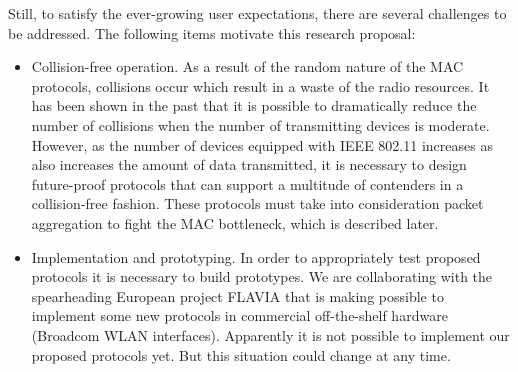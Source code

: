 \documentclass[a4paper,twocolumns]{article}%
\begin{document}
Still, to satisfy the ever-growing user expectations, there are several challenges to be addressed.
The following items motivate this research proposal:
\begin{itemize}
\item Collision-free operation.
As a result of the random nature of the MAC protocols, collisions occur which result in a waste of the radio resources.
It has been shown in the past that it is possible to dramatically reduce the number of collisions when the number of transmitting devices is moderate.
However, as the number of devices equipped with IEEE 802.11 increases as also increases the amount of data transmitted, it is necessary to design future-proof protocols that can support a multitude of contenders in a collision-free fashion.
These protocols must take into consideration packet aggregation to fight the MAC bottleneck, which is described later.
\item Implementation and prototyping.
In order to appropriately test proposed protocols it is necessary to build prototypes.
We are collaborating with the spearheading European project FLAVIA that is making possible to implement some new protocols in commercial off-the-shelf hardware (Broadcom WLAN interfaces).
Apparently it is not possible to implement our proposed protocols yet.
But this situation could change at any time.


\end{itemize}
\end{document}
